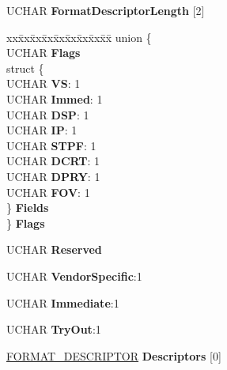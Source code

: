 \begin{DoxyCompactItemize}
\begin{tabbing}
\end{tabbing}\item 
\mbox{\label{struct___f_o_r_m_a_t___l_i_s_t___h_e_a_d_e_r_ad70649791355c2e9ffa2c0e6aca0b582}} 
U\+C\+H\+AR {\bfseries Format\+Descriptor\+Length} \mbox{[}2\mbox{]}
\item 
\mbox{\label{struct___f_o_r_m_a_t___l_i_s_t___h_e_a_d_e_r_a05a526285fbda71b0071d5f570618cf0}} 
\begin{tabbing}
xx\=xx\=xx\=xx\=xx\=xx\=xx\=xx\=xx\=\kill
union \{\\
\>UCHAR {\bfseries Flags}\\
\>struct \{\\
\>\>UCHAR {\bfseries VS}: 1\\
\>\>UCHAR {\bfseries Immed}: 1\\
\>\>UCHAR {\bfseries DSP}: 1\\
\>\>UCHAR {\bfseries IP}: 1\\
\>\>UCHAR {\bfseries STPF}: 1\\
\>\>UCHAR {\bfseries DCRT}: 1\\
\>\>UCHAR {\bfseries DPRY}: 1\\
\>\>UCHAR {\bfseries FOV}: 1\\
\>\} {\bfseries Fields}\\
\} {\bfseries Flags}\\

\end{tabbing}\item 
\mbox{\label{struct___f_o_r_m_a_t___l_i_s_t___h_e_a_d_e_r_a87227499cf6176488c4cc46995ae1be6}} 
U\+C\+H\+AR {\bfseries Reserved}
\item 
\mbox{\label{struct___f_o_r_m_a_t___l_i_s_t___h_e_a_d_e_r_a4d12bc0ec966d54c7f59e7fad6897b1b}} 
U\+C\+H\+AR {\bfseries Vendor\+Specific}\+:1
\item 
\mbox{\label{struct___f_o_r_m_a_t___l_i_s_t___h_e_a_d_e_r_a122f287d255f3080cc4b378ee79a485a}} 
U\+C\+H\+AR {\bfseries Immediate}\+:1
\item 
\mbox{\label{struct___f_o_r_m_a_t___l_i_s_t___h_e_a_d_e_r_abc3347b2f1d0f40537edcf389ab9eb32}} 
U\+C\+H\+AR {\bfseries Try\+Out}\+:1
\item 
\mbox{\label{struct___f_o_r_m_a_t___l_i_s_t___h_e_a_d_e_r_aeb76714daa0c32b898e24fd7c004ba9e}} 
\hyperlink{struct___f_o_r_m_a_t___d_e_s_c_r_i_p_t_o_r}{F\+O\+R\+M\+A\+T\+\_\+\+D\+E\+S\+C\+R\+I\+P\+T\+OR} {\bfseries Descriptors} \mbox{[}0\mbox{]}
\end{DoxyCompactItemize}


